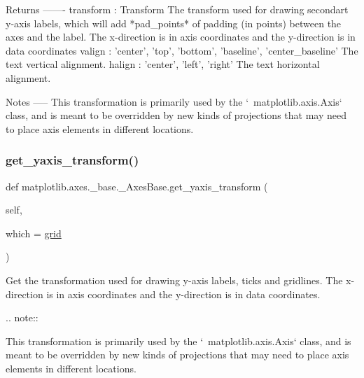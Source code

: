 \begin{DoxyVerb}Returns
-------
transform : Transform
    The transform used for drawing secondart y-axis labels, which will
    add *pad_points* of padding (in points) between the axes and the
    label.  The x-direction is in axis coordinates and the y-direction
    is in data coordinates
valign : {'center', 'top', 'bottom', 'baseline', 'center_baseline'}
    The text vertical alignment.
halign : {'center', 'left', 'right'}
    The text horizontal alignment.

Notes
-----
This transformation is primarily used by the `~matplotlib.axis.Axis`
class, and is meant to be overridden by new kinds of projections that
may need to place axis elements in different locations.
\end{DoxyVerb}
 \mbox{\label{classmatplotlib_1_1axes_1_1__base_1_1__AxesBase_a071664e43e7c9dab30c33714fde21353}} 
\subsubsection{\texorpdfstring{get\+\_\+yaxis\+\_\+transform()}{get\_yaxis\_transform()}}
{\footnotesize\ttfamily def matplotlib.\+axes.\+\_\+base.\+\_\+\+Axes\+Base.\+get\+\_\+yaxis\+\_\+transform (\begin{DoxyParamCaption}\item[{}]{self,  }\item[{}]{which = {\ttfamily \textquotesingle{}\hyperlink{classmatplotlib_1_1axes_1_1__base_1_1__AxesBase_aadaa6527c7642ea25841d7f7a12bc899}{grid}\textquotesingle{}} }\end{DoxyParamCaption})}

\begin{DoxyVerb}Get the transformation used for drawing y-axis labels, ticks
and gridlines.  The x-direction is in axis coordinates and the
y-direction is in data coordinates.

.. note::

    This transformation is primarily used by the
    `~matplotlib.axis.Axis` class, and is meant to be
    overridden by new kinds of projections that may need to
    place axis elements in different locations.
\end{DoxyVerb}
 \mbox{\label{classmatplotlib_1_1axes_1_1__base_1_1__AxesBase_a9663f533fd7459f9d83dc829a5270cad}} 
